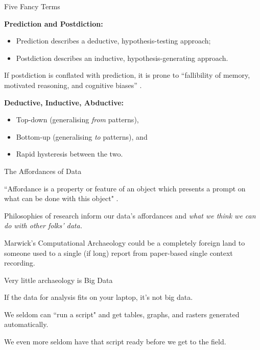 \documentclass[aspectratio=1610, 11pt]{beamer} %
\begin{document}
\begin{frame}{Five Fancy Terms}

\textbf{Prediction and Postdiction:}
\begin{itemize}[label=\textbullet]
\item Prediction describes a deductive, hypothesis-testing approach;
\item Postdiction describes an inductive, hypothesis-generating approach.
\end{itemize}

If postdiction is conflated with prediction, it is prone to “fallibility of memory, motivated reasoning, and cognitive biases” \cite{Nosek2018-ym}.

\textbf{Deductive, Inductive, Abductive:}
\begin{itemize}[label=\textbullet]
\item Top-down (generalising \textit{from} patterns), 
\item Bottom-up (generalising \textit{to} patterns), and 
\item Rapid hysteresis between the two. 
\end{itemize}

\end{frame}

\begin{frame}{The Affordances of Data}

``Affordance is a property or feature of an object which presents a prompt on what can be done with this object" \cite{Tubik_Studio2018-ky}.

Philosophies of research inform our data's affordances and \textit{what we think we can do with other folks' data.} 

Marwick's Computational Archaeology \cite{Marwick2017-bb} could be a completely foreign land to someone used to a single (if long) report from paper-based single context recording. 

\end{frame}

\begin{frame}{Very little archaeology is Big Data}

If the data for analysis fits on your laptop, it's not big data.

We seldom can ``run a script" and get tables, graphs, and rasters generated automatically.

We even more seldom have that script ready before we get to the field.
\end{frame}
\end{document}
